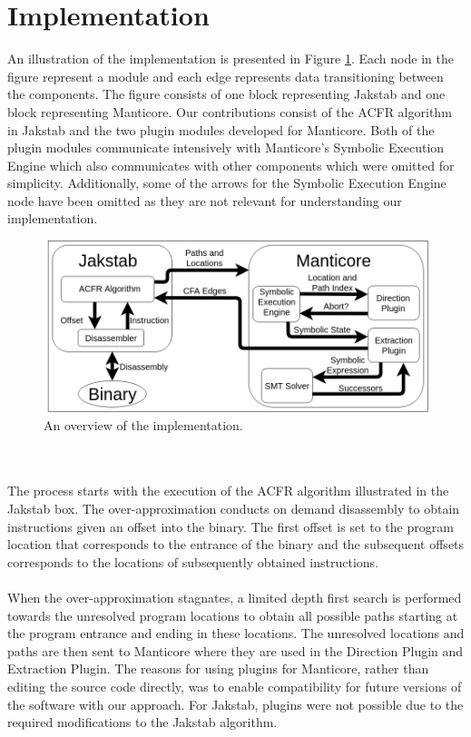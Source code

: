 \documentclass{kththesis}
\newcommand{\fbcomment}[1]{{#1}}
\renewcommand{\fbcomment}[1]{}
\begin{document}
\section{Implementation}
\fbcomment{\color{red}Goal: Describe how Manticore was implemented (Considering to remove this section as I am not sure that is it "scientifically relevant")}
An illustration of the implementation is presented in Figure \ref{fig:implementationOverview}. Each node in the figure represent a module and each edge represents data transitioning between the components. The figure consists of one block representing Jakstab and one block representing Manticore. Our contributions consist of the ACFR algorithm in Jakstab and the two plugin modules developed for Manticore. Both of the plugin modules communicate intensively with Manticore's Symbolic Execution Engine which also communicates with other components which were omitted for simplicity. Additionally, some of the arrows for the Symbolic Execution Engine node have been omitted as they are not relevant for understanding our implementation.
\begin{figure}[!t]
    \centering
    \includegraphics[scale=0.41]{Images/ImplementationOverview.png}
    \caption{An overview of the implementation.}
    \label{fig:implementationOverview}
\end{figure}
\\ \\
The process starts with the execution of the ACFR algorithm illustrated in the Jakstab box. The over-approximation conducts on demand disassembly to obtain instructions given an offset into the binary. The first offset is set to the program location that corresponds to the entrance of the binary and the subsequent offsets corresponds to the locations of subsequently obtained instructions. 
\\ \\
When the over-approximation stagnates, a limited depth first search is performed towards the unresolved program locations to obtain all possible paths starting at the program entrance and ending in these locations. The unresolved locations and paths are then sent to Manticore where they are used in the Direction Plugin and Extraction Plugin. The reasons for using plugins for Manticore, rather than editing the source code directly, was to enable compatibility for future versions of the software with our approach. For Jakstab, plugins were not possible due to the required modifications to the Jakstab algorithm.
\end{document}
